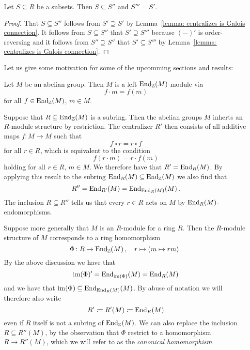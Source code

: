 \begin{corollary}
  Let $S \subseteq R$ be a subsets.
  Then $S \subseteq S''$ and $S''' = S'$.
\end{corollary}


\begin{proof}
  That $S \subseteq S''$ follows from $S' \supseteq S'$ by Lemma~\ref{lemma: centralizes is Galois connection}.
  It follows from $S \subseteq S''$ that $S' \supseteq S'''$ because $(-)'$ is order-reversing and it follows from $S'' \supseteq S''$ that $S' \subseteq S'''$ by Lemma~\ref{lemma: centralizes is Galois connection}.
\end{proof}


\begin{fluff}
  Let us give some motivation for some of the upcomming sections and results:
  
  Let $M$ be an abelian group.
  Then $M$ is a left $\operatorname{End}_{\mathbb{Z}}(M)$-module via
  \[
      f \cdot m
    = f(m)
  \]
  for all $f \in \operatorname{End}_{\mathbb{Z}}(M)$, $m \in M$.
  
  Suppose that $R \subseteq \operatorname{End}_{\mathbb{Z}}(M)$ is a subring.
  Then the abelian groups $M$ inherts an $R$-module structure by restriction.
  The centralizer $R'$ then consists of all additive maps $f \colon M \to M$ such that
  \[
    f \circ r = r \circ f
  \]
  for all $r \in R$, which is equivalent to the condition
  \[
    f(r \cdot m) = r \cdot f(m)
  \]
  holding for all $r \in R$, $m \in M$.
  We therefore have that $R' = \operatorname{End}_R(M)$.
  By applying this result to the subring $\operatorname{End}_R(M) \subseteq \operatorname{End}_{\mathbb{Z}}(M)$ we also find that
  \[
      R'' 
    = \operatorname{End}_{R'}(M)
    = \operatorname{End}_{\operatorname{End}_R(M)}(M) \,.
  \]
  The inclusion $R \subseteq R''$ tells us that every $r \in R$ acts on $M$ by $\operatorname{End}_R(M)$-endomorphisms.
  
  Suppose more generally that $M$ is an $R$-module for a ring $R$.
  Then the $R$-module structure of $M$ corresponds to a ring homomorphism
  \[
            \Phi
    \colon  R
    \to     \operatorname{End}_{\mathbb{Z}}(M) \,,
    \quad   r
    \mapsto (m \mapsto rm) \,. 
  \]
  By the above discussion we have that
  \[
      \operatorname{im}(\Phi)'
    = \operatorname{End}_{\operatorname{im}(\Phi)}(M)
    = \operatorname{End}_R(M) 
  \]
  and we have that $\operatorname{im}(\Phi) \subseteq \operatorname{End}_{\operatorname{End}_R(M)}(M)$.
  By abuse of notation we will therefore also write
  \[
              R'
    \coloneqq  R'(M)
    \coloneqq  \operatorname{End}_R(M)
  \]
  even if $R$ itself is not a subring of $\operatorname{End}_{\mathbb{Z}}(M)$.
  We can also replace the inclusion $R \subseteq R''(M)$, by the observation that $\Phi$ restrict to a homomorphism $R \to R''(M)$, which we will refer to as the \emph{canonical homomorphism}.
  

\end{fluff}
